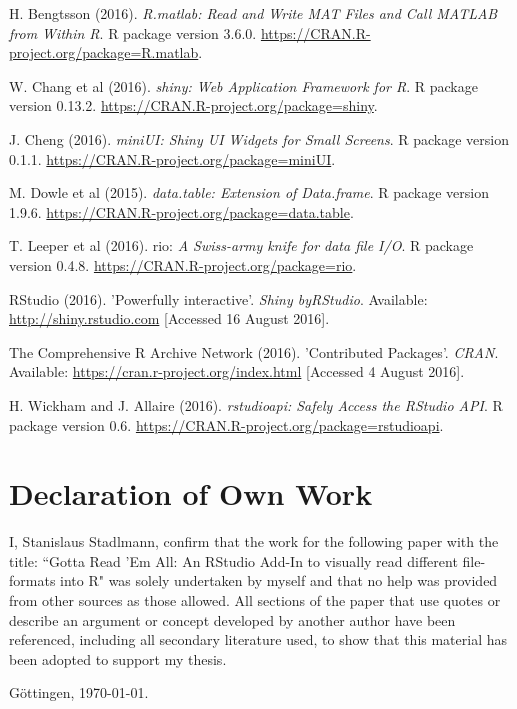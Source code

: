 \documentclass[12pt]{article} %
\begin{document}
\clearpage

\begin{thebibliography}{59}
\begin{singlespace}

H. Bengtsson (2016). \emph{R.matlab: Read and Write MAT Files and Call
MATLAB from Within R}. R package version 3.6.0.
\url{https://CRAN.R-project.org/package=R.matlab}.

W. Chang et al (2016).
\emph{shiny: Web Application Framework for R}. R package version 0.13.2.
\url{https://CRAN.R-project.org/package=shiny}.

J. Cheng (2016). \emph{miniUI: Shiny UI Widgets for Small Screens}. R
package version 0.1.1. \url{https://CRAN.R-project.org/package=miniUI}.

M. Dowle et al (2015). \emph{data.table: Extension of Data.frame}. R
package version 1.9.6. \url{https://CRAN.R-project.org/package=data.table}.

T. Leeper et al (2016). rio: \emph{A Swiss-army knife for data file I/O}. R package version 0.4.8. 
\url{https://CRAN.R-project.org/package=rio}.

RStudio (2016). 'Powerfully interactive'. \emph{Shiny byRStudio}.
Available: \url{http://shiny.rstudio.com} 
[Accessed 16 August 2016].

The Comprehensive R Archive Network (2016). 'Contributed Packages'. \emph{CRAN}.
Available: \url{https://cran.r-project.org/index.html} 
[Accessed 4 August 2016].

H. Wickham and J. Allaire (2016). \emph{rstudioapi: Safely Access the
RStudio API}. R package version 0.6.
\url{https://CRAN.R-project.org/package=rstudioapi}.



\clearpage
\thispagestyle{empty}
\section*{Declaration of Own Work}
I, Stanislaus Stadlmann, confirm that the work for the following paper with the title: ``Gotta Read 'Em All: An RStudio Add-In to visually read different file-formats into R" was solely undertaken by myself and that no help was provided from other sources as those allowed. All sections of the paper that use quotes or describe an argument or concept developed by another author have been referenced, including all secondary literature used, to show that this material has been adopted to support my thesis.

Göttingen, \today.
\clearpage



\end{singlespace}
\end{thebibliography}
\end{document}
